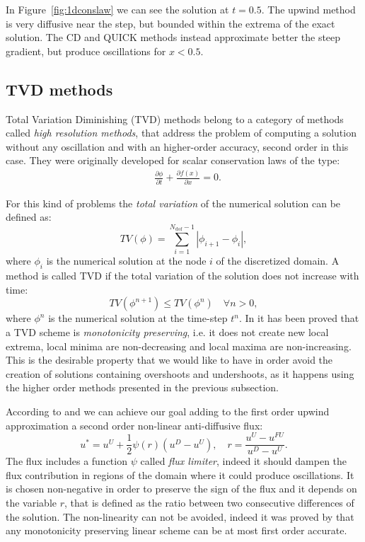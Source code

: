 In Figure~\ref{fig:1dconslaw} we can see the solution at $t=0.5$. The upwind 
method is very diffusive near the step, but bounded within the extrema of the 
exact solution. The CD and QUICK methods instead approximate better the steep 
gradient, but produce oscillations for $x<0.5$.
%
\subsection{TVD methods} \label{subsec:tvd}
Total Variation Diminishing (TVD) methods belong to a category of methods 
called \emph{high resolution methods}, that address the problem of computing a 
solution without any oscillation and with an higher-order accuracy, second 
order in this case. They were originally developed for scalar conservation laws 
of the type:
\begin{align}
	\label{eq:conslaw} &\frac{\partial \phi}{\partial t} + \frac{\partial f(x) 
	}{\partial x} = 0. 
\end{align}

For this kind of problems the \emph{total variation} of the numerical solution 
can be defined as:
\begin{equation}
	TV(\phi) = \sum_{i=1}^{N_\text{dof}-1} |\phi_{i+1} - \phi_i|,
\end{equation}
where $\phi_i$ is the numerical solution at the node $i$ of the discretized 
domain. A method is called TVD if the total variation of the 
solution does not increase with time: 
\begin{equation}\label{eq:tvdcondition}
	TV(\phi ^{n+1}) \leq TV(\phi^n) \quad \forall n>0,
\end{equation}
where $\phi^n$ is the numerical solution at the time-step $t^n$. In 
\cite{tvd:monotonicity} it has been proved that a TVD scheme is 
\emph{monotonicity preserving}, i.e. it does not create new 
local extrema, local minima are non-decreasing and local maxima are 
non-increasing. This is the desirable property that we would like to have in 
order avoid the creation of solutions containing overshoots and undershoots, 
as it happens using the higher order methods presented in the previous 
subsection.

According to \cite{tvd:sweeby} and \cite{main:darwish} we can achieve our 
goal adding to the first order upwind approximation a second order 
non-linear 
anti-diffusive flux: 
\begin{equation} \label{eq:tvdformula}
u^* = u^U + \frac{1}{2}\psi(r)(u^D - u^U), \quad r = 
\frac{u^U - u^{FU}}{u^D - u^U}.
\end{equation}
The flux includes a function $\psi$ called \emph{flux limiter}, indeed it 
should dampen the flux contribution in regions of the domain where it 
could produce oscillations. It is chosen non-negative in order to preserve the 
sign of the flux and it depends on the variable $r$, that is defined as the 
ratio between two consecutive differences of the solution. The non-linearity 
can not be avoided, indeed it was proved by \textcite{tvd:godunov} that any 
monotonicity preserving linear scheme can be at most first order accurate.

